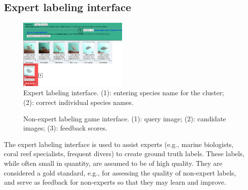 \documentclass{sig-alternate}
\begin{document}
\subsection*{Expert labeling interface}
%
\begin{figure}[b!]
\centering
\includegraphics[width=0.48\textwidth]{expert_anno}
\caption{Expert labeling interface. (1): entering species name for the cluster; (2): correct individual species names.}%
\label{fig:expert}
\end{figure}
%
\begin{figure}[t!]
\centering
{}
\caption{Non-expert labeling game interface. (1): query image; (2): candidate images; (3): feedback scores.}
\label{fig:nonexpert}
\end{figure}
%
The expert labeling interface is used to assist experts (e.g., marine biologists, 
coral reef specialists, frequent divers) to create ground truth labels. 
These labels, while often small in quantity, are assumed to be of high quality.
They are considered a gold standard, e.g., for assessing the quality of non-expert
labels, and serve as feedback for non-experts so that they may learn 
and improve. 
\end{document}
